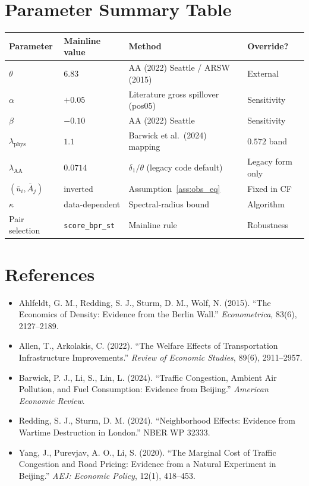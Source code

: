 \documentclass[11pt]{article}
\newcommand{\ubar}{\bar u}
\newcommand{\Abar}{\bar A}
\newcommand{\phys}{\mathrm{phys}}
\newcommand{\AAcal}{\mathrm{AA}}
\begin{document}
\section{Parameter Summary Table}\label{sec:summary_table}

\begin{center}
\begin{tabular}{@{}llll@{}}
\toprule
Parameter & Mainline value & Method & Override? \\
\midrule
$\theta$ & $6.83$ & AA (2022) Seattle / ARSW (2015) & External \\
$\alpha$ & $+0.05$ & Literature gross spillover (pos05) & Sensitivity \\
$\beta$ & $-0.10$ & AA (2022) Seattle & Sensitivity \\
$\lambda_{\phys}$ & $1.1$ & Barwick et al.\ (2024) mapping & $0.572$ band \\
$\lambda_{\AAcal}$ & $0.0714$ & $\delta_1/\theta$ (legacy code default) & Legacy form only \\
$(\ubar_i,\Abar_j)$ & inverted & Assumption~\ref{ass:obs_eq} & Fixed in CF \\
$\kappa$ & data-dependent & Spectral-radius bound & Algorithm \\
Pair selection & \texttt{score\_bpr\_st} & Mainline rule & Robustness \\
\bottomrule
\end{tabular}
\end{center}

\section*{References}

\begin{itemize}[leftmargin=2em]
  \item Ahlfeldt, G. M., Redding, S. J., Sturm, D. M., Wolf, N. (2015).
        ``The Economics of Density: Evidence from the Berlin Wall.''
        \emph{Econometrica}, 83(6), 2127--2189.
  \item Allen, T., Arkolakis, C. (2022). ``The Welfare Effects of
        Transportation Infrastructure Improvements.''
        \emph{Review of Economic Studies}, 89(6), 2911--2957.
  \item Barwick, P. J., Li, S., Lin, L. (2024). ``Traffic Congestion,
        Ambient Air Pollution, and Fuel Consumption: Evidence from
        Beijing.'' \emph{American Economic Review}.
  \item Redding, S. J., Sturm, D. M. (2024). ``Neighborhood Effects:
        Evidence from Wartime Destruction in London.'' NBER WP 32333.
  \item Yang, J., Purevjav, A. O., Li, S. (2020). ``The Marginal Cost
        of Traffic Congestion and Road Pricing: Evidence from a Natural
        Experiment in Beijing.'' \emph{AEJ: Economic Policy}, 12(1),
        418--453.
\end{itemize}
\end{document}
